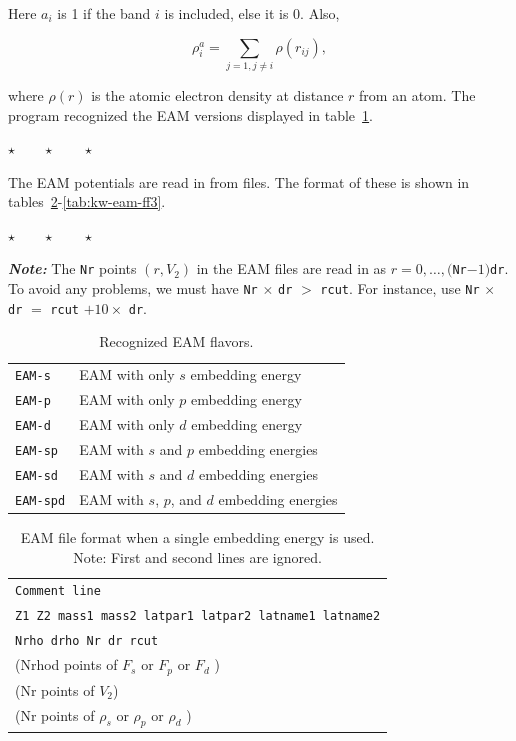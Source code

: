 \documentclass[a4paper,12pt,pdftex,onecolumn]{article}
\newcommand{\stars}{\begin{center}%
\vspace{1em plus 0.5em minus 0.5em}%
$\star \qquad \star \qquad \star$%
\vspace{1em plus 0.5em minus 0.5em}%
\end{center}}
\begin{document}
Here $a_i$ is 1 if the band $i$ is included, else it is 0.
Also,

\begin{equation}
\rho^a_i = \sum_{j=1, j\neq i} \rho(r_{ij}),
\end{equation}

where $\rho(r)$ is the atomic electron density at distance $r$
from an atom. The program recognized the EAM versions displayed
in table~\ref{tab:kw-eam}.

\stars



The EAM potentials are read in from files. The format of these
is shown in tables~\ref{tab:kw-eam-ff}-\ref{tab:kw-eam-ff3}.

\stars

{\large \textit{\textbf{Note:}}} The \verb+Nr+ points $(r, V_2)$
in the EAM files are read in as
$r = 0, \ldots,($\verb+Nr+$-1)$\verb+dr+.
To avoid any problems, we must have \verb+Nr+ $\times$ \verb+dr+ $>$ \verb+rcut+.
For instance, use 
\verb+Nr+ $\times$ \verb+dr+ $=$ \verb+rcut+ $+ 10 \times$ \verb+dr+.



\begin{table}[!h]
\caption{
Recognized EAM flavors.
\label{tab:kw-eam}
}
\begin{center}
\begin{tabular}{|l|l|}
\hline
\hline
\verb+EAM-s+         & EAM with only $s$ embedding energy \\
\verb+EAM-p+         & EAM with only $p$ embedding energy \\
\verb+EAM-d+         & EAM with only $d$ embedding energy \\
\verb+EAM-sp+        & EAM with $s$ and $p$ embedding energies \\
\verb+EAM-sd+        & EAM with $s$ and $d$ embedding energies \\
\verb+EAM-spd+       & EAM with $s$, $p$, and $d$ embedding energies \\
\hline
\hline
\end{tabular}
\end{center}
\end{table}


\begin{table}[!h]
\caption{
EAM file format when a single embedding energy is used.
Note: First and second lines are ignored.
\label{tab:kw-eam-ff}
}
\begin{center}
\begin{tabular}{|l|}
\hline
\hline
\verb+Comment line+ \\
\verb+Z1 Z2 mass1 mass2 latpar1 latpar2 latname1 latname2+ \\
\verb+Nrho drho Nr dr rcut+ \\
(Nrhod points of $F_s$ or $F_p$ or $F_d$ ) \\
(Nr points of $V_2$)  \\
(Nr points of $\rho_s$ or $\rho_p$ or $\rho_d$ ) \\
\hline
\hline
\end{tabular}
\end{center}
\end{table}
\end{document}

